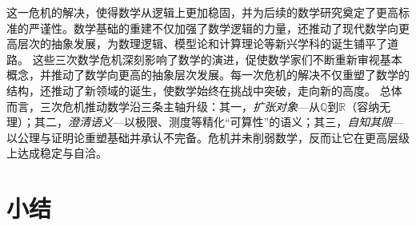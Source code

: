 这一危机的解决，使得数学从逻辑上更加稳固，并为后续的数学研究奠定了更高标准的严谨性。数学基础的重建不仅加强了数学逻辑的力量，还推动了现代数学向更高层次的抽象发展，为数理逻辑、模型论和计算理论等新兴学科的诞生铺平了道路。
这些三次数学危机深刻影响了数学的演进，促使数学家们不断重新审视基本概念，并推动了数学向更高的抽象层次发展。每一次危机的解决不仅重塑了数学的结构，还推动了新领域的诞生，使数学始终在挑战中突破，走向新的高度。
总体而言，三次危机推动数学沿三条主轴升级：其一，{\itshape 扩张对象}---从$\mathbb{Q}$到$\mathbb{R}$（容纳无理）；其二，{\itshape 澄清语义}---以极限、测度等精化“可算性”的语义；其三，{\itshape 自知其限}---以公理与证明论重塑基础并承认不完备。危机并未削弱数学，反而让它在更高层级上达成稳定与自洽。

\section{小结}


